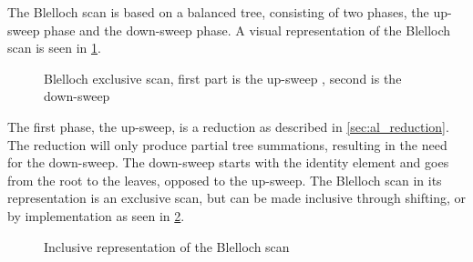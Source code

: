 The Blelloch scan \cite{BlellochTR90} is based on a balanced tree, consisting of two phases, the up-sweep phase and the down-sweep phase. A visual representation of the Blelloch scan is seen in \cref{fig:scan_blelloch}. 

\begin{figure}[ht]
	\centering
	\caption{Blelloch exclusive scan, first part is the up-sweep , second is the down-sweep}
	\label{fig:scan_blelloch}
\end{figure}

The first phase, the up-sweep, is a reduction as described in \cref{sec:al_reduction}. The reduction will only produce partial tree summations, resulting in the need for the down-sweep. The down-sweep starts with the identity element and goes from the root to the leaves, opposed to the up-sweep. The Blelloch scan in its representation is an exclusive scan, but can be made inclusive through shifting, or by implementation as seen in \cref{fig:scan_inclusive}.

\begin{figure}[ht]
	\centering
	\caption{Inclusive representation of the Blelloch scan}
	\label{fig:scan_inclusive}
\end{figure}


